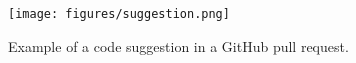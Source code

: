 \begin{figure}[h]
    \texttt{[image: figures/suggestion.png]}
    \caption{Example of a code suggestion in a GitHub pull request.}
    \label{fig:suggestion}
\end{figure}
